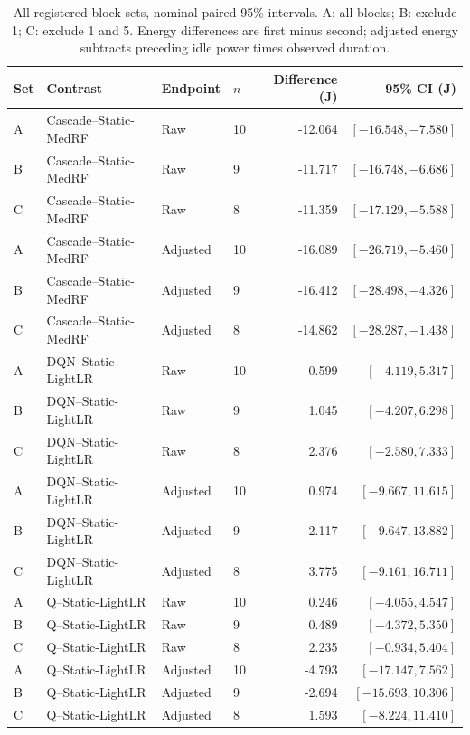 \begin{table}[t]\centering\footnotesize
\caption{All registered block sets, nominal paired 95\% intervals. A: all blocks; B: exclude 1; C: exclude 1 and 5. Energy differences are first minus second; adjusted energy subtracts preceding idle power times observed duration.}\label{tab:sensitivity}
\begin{tabular}{llllrr}\toprule Set & Contrast & Endpoint & $n$ & Difference (J) & 95\% CI (J)\\\midrule
A & Cascade--Static-MedRF & Raw & 10 & -12.064 & $[-16.548,-7.580]$\\
B & Cascade--Static-MedRF & Raw & 9 & -11.717 & $[-16.748,-6.686]$\\
C & Cascade--Static-MedRF & Raw & 8 & -11.359 & $[-17.129,-5.588]$\\
A & Cascade--Static-MedRF & Adjusted & 10 & -16.089 & $[-26.719,-5.460]$\\
B & Cascade--Static-MedRF & Adjusted & 9 & -16.412 & $[-28.498,-4.326]$\\
C & Cascade--Static-MedRF & Adjusted & 8 & -14.862 & $[-28.287,-1.438]$\\
A & DQN--Static-LightLR & Raw & 10 & 0.599 & $[-4.119,5.317]$\\
B & DQN--Static-LightLR & Raw & 9 & 1.045 & $[-4.207,6.298]$\\
C & DQN--Static-LightLR & Raw & 8 & 2.376 & $[-2.580,7.333]$\\
A & DQN--Static-LightLR & Adjusted & 10 & 0.974 & $[-9.667,11.615]$\\
B & DQN--Static-LightLR & Adjusted & 9 & 2.117 & $[-9.647,13.882]$\\
C & DQN--Static-LightLR & Adjusted & 8 & 3.775 & $[-9.161,16.711]$\\
A & Q--Static-LightLR & Raw & 10 & 0.246 & $[-4.055,4.547]$\\
B & Q--Static-LightLR & Raw & 9 & 0.489 & $[-4.372,5.350]$\\
C & Q--Static-LightLR & Raw & 8 & 2.235 & $[-0.934,5.404]$\\
A & Q--Static-LightLR & Adjusted & 10 & -4.793 & $[-17.147,7.562]$\\
B & Q--Static-LightLR & Adjusted & 9 & -2.694 & $[-15.693,10.306]$\\
C & Q--Static-LightLR & Adjusted & 8 & 1.593 & $[-8.224,11.410]$\\
\bottomrule\end{tabular}\end{table}
